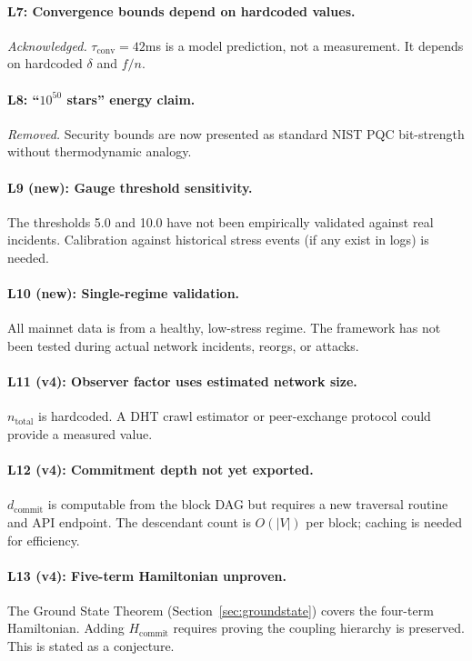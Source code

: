\documentclass[11pt,a4paper]{article}
\begin{document}
\paragraph{L7: Convergence bounds depend on hardcoded values.} \emph{Acknowledged.} $\tau_{\text{conv}} = 42$ms is a model prediction, not a measurement. It depends on hardcoded $\delta$ and $f/n$.

\paragraph{L8: ``$10^{50}$ stars'' energy claim.} \emph{Removed.} Security bounds are now presented as standard NIST PQC bit-strength without thermodynamic analogy.

\paragraph{L9 (new): Gauge threshold sensitivity.} The thresholds 5.0 and 10.0 have not been empirically validated against real incidents. Calibration against historical stress events (if any exist in logs) is needed.

\paragraph{L10 (new): Single-regime validation.} All mainnet data is from a healthy, low-stress regime. The framework has not been tested during actual network incidents, reorgs, or attacks.

\paragraph{L11 (v4): Observer factor uses estimated network size.} $n_{\text{total}}$ is hardcoded. A DHT crawl estimator or peer-exchange protocol could provide a measured value.

\paragraph{L12 (v4): Commitment depth not yet exported.} $d_{\text{commit}}$ is computable from the block DAG but requires a new traversal routine and API endpoint. The descendant count is $O(|V|)$ per block; caching is needed for efficiency.

\paragraph{L13 (v4): Five-term Hamiltonian unproven.} The Ground State Theorem (Section~\ref{sec:groundstate}) covers the four-term Hamiltonian. Adding $H_{\text{commit}}$ requires proving the coupling hierarchy is preserved. This is stated as a conjecture.
\end{document}

